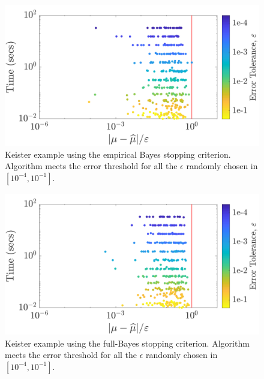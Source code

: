 \documentclass[graybox,footinfo]{svmult}
\begin{document}
\begin{figure}
\centering
\includegraphics[width=0.95\linewidth]{"figures/Sobol/Sobol_Keister_guaranteed_time_MLE__d4_r1_2019-Sep-1"}
\caption[Sobol: Keister guaranteed:EB]{Keister example using the empirical Bayes stopping criterion. Algorithm meets the error threshold for all the $\epsilon$ randomly chosen in $[10^{-4}, 10^{-1}]$.}
\label{FJ:fig:Sobol-keister-guaranteed-EB}
\end{figure}
\begin{figure}
\centering
\includegraphics[width=0.95\linewidth]{"figures/Sobol/Sobol_Keister_guaranteed_time_full__d4_r1_2019-Sep-1"}
\caption[Sobol: Keister guaranteed: Full Bayes]{Keister example using the full-Bayes stopping criterion. Algorithm meets the error threshold for all the $\epsilon$ randomly chosen in $[10^{-4}, 10^{-1}]$.}
\label{FJ:fig:Sobol-keister-guaranteed-FB}
\end{figure}
\end{document}
